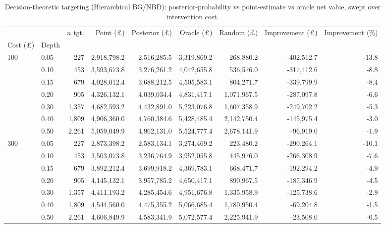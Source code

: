 \begin{table}[htbp]
\centering
\caption{Decision-theoretic targeting (Hierarchical BG/NBD): posterior-probability vs point-estimate vs oracle net value, swept over intervention cost.}
\label{tab:targeting_sim_hierarchical_bg_nbd}
\begin{adjustbox}{max width=\linewidth}
\begin{tabular}{llrrrrrrr}
\toprule
 &  & $n$ tgt. & Point (\pounds) & Posterior (\pounds) & Oracle (\pounds) & Random (\pounds) & Improvement (\pounds) & Improvement (\%) \\
Cost (\pounds) & Depth &  &  &  &  &  &  &  \\
\midrule
\multirow[t]{7}{*}{100} & 0.05 & 227 & 2,918,798.2 & 2,516,285.5 & 3,319,869.2 & 268,880.2 & -402,512.7 & -13.8 \\
 & 0.10 & 453 & 3,593,673.8 & 3,276,261.2 & 4,042,655.8 & 536,576.0 & -317,412.6 & -8.8 \\
 & 0.15 & 679 & 4,028,012.4 & 3,688,212.5 & 4,505,583.1 & 804,271.7 & -339,799.9 & -8.4 \\
 & 0.20 & 905 & 4,326,132.1 & 4,039,034.4 & 4,831,417.1 & 1,071,967.5 & -287,097.8 & -6.6 \\
 & 0.30 & 1,357 & 4,682,593.2 & 4,432,891.0 & 5,223,076.8 & 1,607,358.9 & -249,702.2 & -5.3 \\
 & 0.40 & 1,809 & 4,906,360.0 & 4,760,384.6 & 5,428,485.4 & 2,142,750.4 & -145,975.4 & -3.0 \\
 & 0.50 & 2,261 & 5,059,049.9 & 4,962,131.0 & 5,524,777.4 & 2,678,141.9 & -96,919.0 & -1.9 \\
\cline{1-9}
\multirow[t]{7}{*}{300} & 0.05 & 227 & 2,873,398.2 & 2,583,134.1 & 3,274,469.2 & 223,480.2 & -290,264.1 & -10.1 \\
 & 0.10 & 453 & 3,503,073.8 & 3,236,764.9 & 3,952,055.8 & 445,976.0 & -266,308.9 & -7.6 \\
 & 0.15 & 679 & 3,892,212.4 & 3,699,918.2 & 4,369,783.1 & 668,471.7 & -192,294.2 & -4.9 \\
 & 0.20 & 905 & 4,145,132.1 & 3,957,785.2 & 4,650,417.1 & 890,967.5 & -187,346.9 & -4.5 \\
 & 0.30 & 1,357 & 4,411,193.2 & 4,285,454.6 & 4,951,676.8 & 1,335,958.9 & -125,738.6 & -2.9 \\
 & 0.40 & 1,809 & 4,544,560.0 & 4,475,355.2 & 5,066,685.4 & 1,780,950.4 & -69,204.8 & -1.5 \\
 & 0.50 & 2,261 & 4,606,849.9 & 4,583,341.9 & 5,072,577.4 & 2,225,941.9 & -23,508.0 & -0.5 \\

\end{tabular}
\end{adjustbox}
\end{table}

